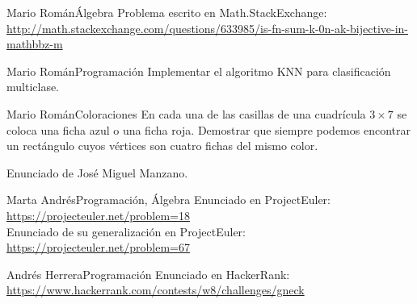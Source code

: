 \documentclass[a4paper, 11pt]{article} %
\numberwithin{prbcounter}{section}
\begin{document}
  
  \begin{enunciado}{Mario Román}{Álgebra}
    Problema escrito en Math.StackExchange:
    \url{http://math.stackexchange.com/questions/633985/is-fn-sum-k-0n-ak-bijective-in-mathbbz-m}
  \end{enunciado}

  \begin{enunciado}{Mario Román}{Programación}
    Implementar el algoritmo KNN para clasificación multiclase.
  \end{enunciado}

  \begin{enunciado}{Mario Román}{Coloraciones}
   En cada una de las casillas de una cuadrícula $3 \times 7$ se coloca una ficha azul o una ficha roja.
   Demostrar que siempre podemos encontrar un rectángulo cuyos vértices son cuatro fichas del mismo
   color.
   
   Enunciado de José Miguel Manzano. 
  \end{enunciado}

  \begin{enunciado}{Marta Andrés}{Programación, Álgebra}
   Enunciado en ProjectEuler: \url{https://projecteuler.net/problem=18} \\
   Enunciado de su generalización en ProjectEuler: \url{https://projecteuler.net/problem=67}
  \end{enunciado}
  
  
  \begin{enunciado}{Andrés Herrera}{Programación}
    Enunciado en HackerRank: \url{https://www.hackerrank.com/contests/w8/challenges/gneck}
  \end{enunciado}

  
\end{document}
